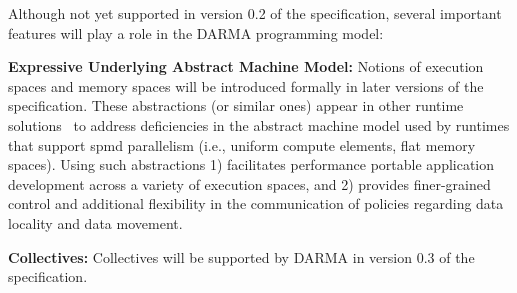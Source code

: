 Although not yet supported in version 0.2 of the specification, several
important features will play a role in the DARMA programming model:
\begin{compactdesc}
\item{\bf Expressive Underlying Abstract Machine Model:}
Notions of \glspl{execution space} and \glspl{memory space} will be introduced
formally in later
versions of the specification.  These abstractions (or similar ones) appear in other runtime
solutions~\cite{kokkos, others}  to
address deficiencies in the abstract machine model used by runtimes that
support \gls{spmd} parallelism (i.e., uniform compute elements, flat memory
    spaces).  Using such abstractions
1) facilitates performance portable application development across 
a variety of execution spaces, and 2)
  provides finer-grained control and additional flexibility in the
  communication of policies regarding data locality and data movement. 
\item{\bf Collectives:}
Collectives will be supported by DARMA in version 0.3 of the specification.
\end{compactdesc}
